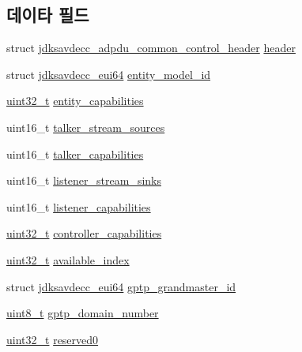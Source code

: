 \subsection*{데이타 필드}
\begin{DoxyCompactItemize}
\item 
struct \hyperlink{structjdksavdecc__adpdu__common__control__header}{jdksavdecc\+\_\+adpdu\+\_\+common\+\_\+control\+\_\+header} \hyperlink{structjdksavdecc__adpdu_a250e8a37ff2e4ef65d00d9175619a72a}{header}
\item 
struct \hyperlink{structjdksavdecc__eui64}{jdksavdecc\+\_\+eui64} \hyperlink{structjdksavdecc__adpdu_a2d1d52d1ec5c6100b61acf3daa452c56}{entity\+\_\+model\+\_\+id}
\item 
\hyperlink{parse_8c_a6eb1e68cc391dd753bc8ce896dbb8315}{uint32\+\_\+t} \hyperlink{structjdksavdecc__adpdu_ae3350328f131c8382ba5030939a2a484}{entity\+\_\+capabilities}
\item 
uint16\+\_\+t \hyperlink{structjdksavdecc__adpdu_a9bd7d7b8ebd60d782a8b2be740355a37}{talker\+\_\+stream\+\_\+sources}
\item 
uint16\+\_\+t \hyperlink{structjdksavdecc__adpdu_a51f25c5187ed3f58d17c11e1dc0f3352}{talker\+\_\+capabilities}
\item 
uint16\+\_\+t \hyperlink{structjdksavdecc__adpdu_aacb4d50f4068a0a36c8746e0571bf53b}{listener\+\_\+stream\+\_\+sinks}
\item 
uint16\+\_\+t \hyperlink{structjdksavdecc__adpdu_a3323f8a756edef6c94b10e2ab6c962ee}{listener\+\_\+capabilities}
\item 
\hyperlink{parse_8c_a6eb1e68cc391dd753bc8ce896dbb8315}{uint32\+\_\+t} \hyperlink{structjdksavdecc__adpdu_a66f07a4a428e308f20990a0e6bbfea0c}{controller\+\_\+capabilities}
\item 
\hyperlink{parse_8c_a6eb1e68cc391dd753bc8ce896dbb8315}{uint32\+\_\+t} \hyperlink{structjdksavdecc__adpdu_abbe4a72641a81cba6569feb1a446d431}{available\+\_\+index}
\item 
struct \hyperlink{structjdksavdecc__eui64}{jdksavdecc\+\_\+eui64} \hyperlink{structjdksavdecc__adpdu_a34b9bb3bd1ced443f07d42e42d8e9704}{gptp\+\_\+grandmaster\+\_\+id}
\item 
\hyperlink{stdint_8h_aba7bc1797add20fe3efdf37ced1182c5}{uint8\+\_\+t} \hyperlink{structjdksavdecc__adpdu_ac53b4e61c0f960e16c86cfe678ca256d}{gptp\+\_\+domain\+\_\+number}
\item 
\hyperlink{parse_8c_a6eb1e68cc391dd753bc8ce896dbb8315}{uint32\+\_\+t} \hyperlink{structjdksavdecc__adpdu_aed93283265f941dc1d2bf8d634164493}{reserved0}

\end{DoxyCompactItemize}
